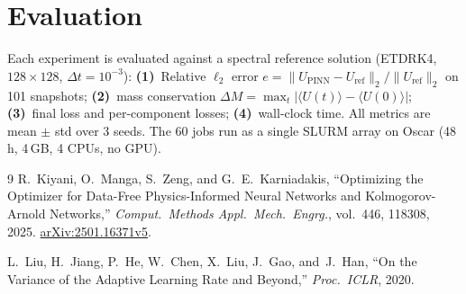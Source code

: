 \documentclass[11pt,a4paper]{article}
\begin{document}
\section{Evaluation}

Each experiment is evaluated against a spectral reference solution (ETDRK4, $128\times128$, $\Delta t = 10^{-3}$):
\textbf{(1)}~Relative $\ell_2$ error $e = \|U_\text{PINN} - U_\text{ref}\|_2 / \|U_\text{ref}\|_2$ on 101 snapshots;
\textbf{(2)}~mass conservation $\Delta M = \max_t |\langle U(t)\rangle - \langle U(0)\rangle|$;
\textbf{(3)}~final loss and per-component losses;
\textbf{(4)}~wall-clock time.
All metrics are mean $\pm$ std over 3 seeds.
The 60 jobs run as a single SLURM array on Oscar (48\,h, 4\,GB, 4 CPUs, no GPU).

\begin{thebibliography}{9}
R.~Kiyani, O.~Manga, S.~Zeng, and G.~E.~Karniadakis,
``Optimizing the Optimizer for Data-Free Physics-Informed Neural Networks and Kolmogorov-Arnold Networks,''
\textit{Comput.\ Methods Appl.\ Mech.\ Engrg.}, vol.~446, 118308, 2025.
\href{https://arxiv.org/abs/2501.16371}{arXiv:2501.16371v5}.

L.~Liu, H.~Jiang, P.~He, W.~Chen, X.~Liu, J.~Gao, and~J.~Han,
``On the Variance of the Adaptive Learning Rate and Beyond,''
\textit{Proc.\ ICLR}, 2020.
\end{thebibliography}
\end{document}
